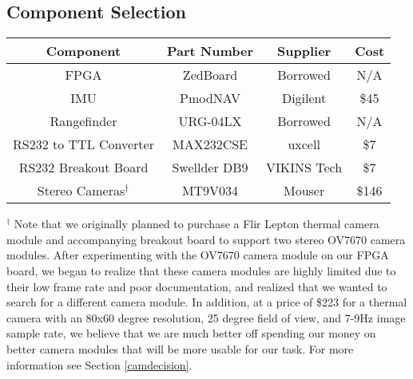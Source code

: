 \subsection{Component Selection} \label{componentSelection}

\begin{center}
\begin{tabular}{ |c|c|c|c| } 
 \hline
 \textbf{Component} & \textbf{Part Number}  & \textbf{Supplier} & \textbf{Cost}  \\ \hline
 FPGA & ZedBoard & Borrowed & N/A  \\ \hline
 IMU & PmodNAV & Digilent & \$45  \\ \hline
 Rangefinder & URG-04LX & Borrowed & N/A  \\ \hline
 RS232 to TTL Converter & MAX232CSE & uxcell & \$7  \\ \hline
 RS232 Breakout Board & Swellder DB9 & VIKINS Tech & \$7  \\ \hline
 Stereo Cameras$^\dagger$ & MT9V034 & Mouser & \$146  \\ 
 \hline
\end{tabular}
\end{center}
$^\dagger$ Note that we originally planned to purchase a Flir Lepton thermal camera module and accompanying breakout board to support two stereo OV7670 camera modules. After experimenting with the OV7670 camera module on our FPGA board, we began to realize that these camera modules are highly limited due to their low frame rate and poor documentation, and realized that we wanted to search for a different camera module. In addition, at a price of \$223 for a thermal camera with an 80x60 degree resolution, 25 degree field of view, and 7-9Hz image sample rate, we believe that we are much better off spending our money on better camera modules that will be more usable for our task. For more information see Section \ref{camdecision}.